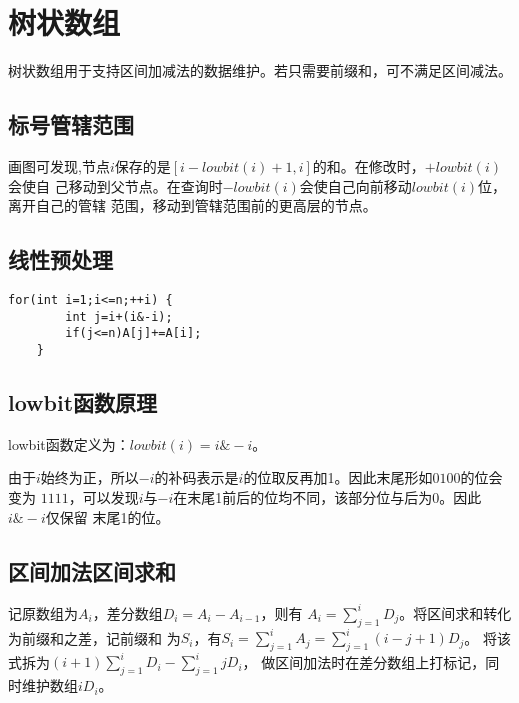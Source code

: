 \section{树状数组}
树状数组用于支持区间加减法的数据维护。若只需要前缀和，可不满足区间减法。
\subsection{标号管辖范围}

画图可发现,节点$i$保存的是$[i-lowbit(i)+1,i]$的和。在修改时，$+lowbit(i)$会使自
己移动到父节点。在查询时$-lowbit(i)$会使自己向前移动$lowbit(i)$位，离开自己的管辖
范围，移动到管辖范围前的更高层的节点。

\subsection{线性预处理}

\begin{lstlisting}[title=LinearBuild]
    for(int i=1;i<=n;++i) {
        int j=i+(i&-i);
        if(j<=n)A[j]+=A[i];
    }
\end{lstlisting}

\subsection{lowbit函数原理}

lowbit函数定义为：$lowbit(i)=i\&-i$。

由于$i$始终为正，所以$-i$的补码表示是$i$的位取反再加1。因此末尾形如$0100$的位会变为
$1111$，可以发现$i$与$-i$在末尾1前后的位均不同，该部分位与后为0。因此$i\&-i$仅保留
末尾1的位。
\subsection{区间加法区间求和}
记原数组为$A_i$，差分数组$D_i=A_i-A_{i-1}$，则有
$\displaystyle A_i=\sum_{j=1}^i{D_j}$。将区间求和转化为前缀和之差，记前缀和
为$S_i$，有$\displaystyle S_i=\sum_{j=1}^i{A_j}=\sum_{j=1}^i{(i-j+1)D_j}$。
将该式拆为$\displaystyle (i+1)\sum_{j=1}^i{D_i}-\sum_{j=1}^i{jD_i}$，
做区间加法时在差分数组上打标记，同时维护数组$iD_i$。
